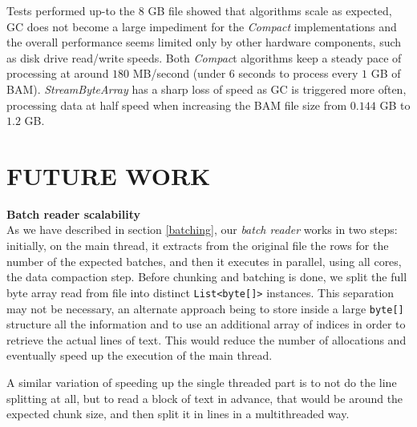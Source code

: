 \documentclass[a4paper,twoside]{article}
\begin{document}
Tests performed up-to the $8$ GB file showed that algorithms scale as expected, GC does not become a large impediment for the {\it Compact} implementations and the overall performance seems limited only by other hardware components, such as disk drive read/write speeds.
Both {\it Compac}t algorithms keep a steady pace of processing at around $180$ MB/second (under $6$ seconds to process every $1$ GB of BAM). {\it StreamByteArray} has a sharp loss of speed as GC is triggered more often, processing data at half speed when increasing the BAM file size from $0.144$ GB to $1.2$ GB.









\section{\uppercase{Future work}}
\label{future}

\textbf{Batch reader scalability} \\
As we have described in section \ref{batching}, our {\it batch reader} works in two steps: initially, on the main thread, it extracts from the original file the rows for the number of the expected batches, and then it executes in parallel, using all cores, the data compaction step.
Before chunking and batching is done, we split the full byte array read from file into distinct  \texttt{List<byte[]>} instances. This separation may not be necessary, an alternate approach being to store inside a large \texttt{byte[]} structure all the information and to use an additional array of indices in order to retrieve the actual lines of text. This would reduce the number of allocations and eventually speed up the execution of the main thread.

A similar variation of speeding up the single threaded part is to not do the line splitting at all, but to read a block of text in advance, that would be around the expected chunk size,
and then split it in lines in a multithreaded way.
\end{document}
